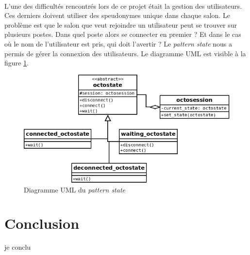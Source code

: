 \documentclass[a4paper]{article}
\begin{document}
			\paragraph{}{
			L'une des difficultés rencontrés lors de ce projet était la gestion des utilisateurs. Ces derniers doivent
			utiliser des speudonymes unique dans chaque salon. Le problème est que le salon que veut rejoindre un utilisateur
			peut se trouver sur plusieurs postes. Dans quel poste alors se connecter en premier ? Et dans le cas où le nom
			de l'utilisateur est pris, qui doit l'avertir ?
			Le \textit{pattern state} nous a permis de gérer la connexion des utilisateurs. Le diagramme UML est visible à la figure \ref{state_uml}.
			}
			\begin{center}
				\begin{figure}
					\includegraphics[scale=0.6]{UML/state.png}
					\caption{\label{state_uml} Diagramme UML du \textit{pattern state}}
				\end{figure}
			\end{center}
	\newpage

	\section*{Conclusion}
		\paragraph{}{je conclu}
\end{document}
